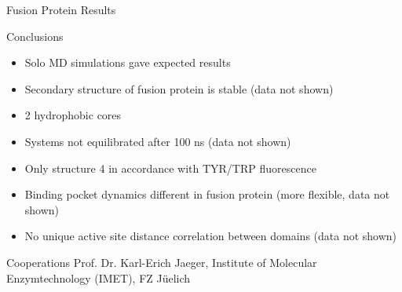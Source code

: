 \documentclass{beamer}
\begin{document}
\begin{frame}[t]
\begin{columns}[T,onlytextwidth]
\begin{column}{.48\linewidth}
{\begin{block}{Fusion Protein Results}
        \end{block}  


%  
%
%        
%
%
 

        \vspace*{1.0ex}
  
        \vfill 

        \begin{block}{Conclusions}
        
            \begin{itemize}
                \item Solo MD simulations gave expected results
                \item Secondary structure of fusion protein is stable (data not shown)
                \item 2 hydrophobic cores
                \item Systems not equilibrated after 100 ns (data not shown)
                \item Only structure 4 in accordance with TYR/TRP fluorescence
                \item Binding pocket dynamics different in fusion protein (more flexible, data not shown)
                \item No unique active site distance correlation between domains (data not shown)
            \end{itemize} 

        \end{block}  
 

        \vspace*{1.0ex}
  
        \vfill
  
        \begin{block}{Cooperations}
        Prof. Dr. Karl-Erich Jaeger, Institute of Molecular Enzymtechnology (IMET), FZ J\"uelich
  

\end{block}}
\end{column}
\end{columns}
\end{frame}
\end{document}
